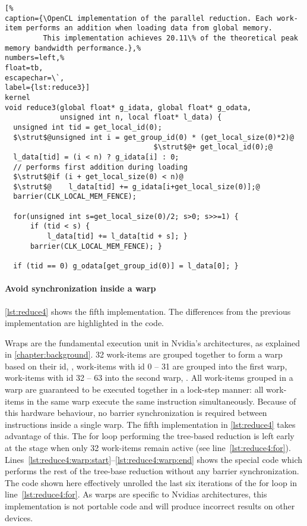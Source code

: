 \begin{lstlisting}[%                                                             
caption={\OpenCL implementation of the parallel reduction. Each work-item performs an addition when loading data from global memory.
         This implementation achieves 20.11\% of the theoretical peak memory bandwidth performance.},%
numbers=left,%
float=tb,
escapechar=\`,
label={lst:reduce3}]
kernel
void reduce3(global float* g_idata, global float* g_odata,
             unsigned int n, local float* l_data) {
  unsigned int tid = get_local_id(0);
  $\strut$@unsigned int i = get_group_id(0) * (get_local_size(0)*2)@
                                   $\strut$@+ get_local_id(0);@
  l_data[tid] = (i < n) ? g_idata[i] : 0;
  // performs first addition during loading
  $\strut$@if (i + get_local_size(0) < n)@
  $\strut$@    l_data[tid] += g_idata[i+get_local_size(0)];@
  barrier(CLK_LOCAL_MEM_FENCE);

  for(unsigned int s=get_local_size(0)/2; s>0; s>>=1) {
      if (tid < s) {
          l_data[tid] += l_data[tid + s]; }
      barrier(CLK_LOCAL_MEM_FENCE); }

  if (tid == 0) g_odata[get_group_id(0)] = l_data[0]; }
\end{lstlisting}

\newpage

\paragraph{Avoid synchronization inside a warp}

\autoref{lst:reduce4} shows the fifth implementation.
The differences from the previous implementation are highlighted in the code.

Wraps are the fundamental execution unit in Nvidia's \GPU architectures, as explained in \autoref{chapter:background}.
32 work-items are grouped together to form a warp based on their id, \ie, work-items with id 0 -- 31 are grouped into the first warp, work-items with id 32 -- 63 into the second warp, \etc.
All work-items grouped in a warp are guaranteed to be executed together in a lock-step manner:
all work-items in the same warp execute the same instruction simultaneously.
Because of this hardware behaviour, no barrier synchronization is required between instructions inside a single warp.
The fifth implementation in \autoref{lst:reduce4} takes advantage of this.
The for loop performing the tree-based reduction is left early at the stage when only 32 work-items remain active (see line~\ref{lst:reduce4:for}).
Lines~\ref{lst:reduce4:warp:start}--\ref{lst:reduce4:warp:end} shows the special code which performs the rest of the tree-base reduction without any barrier synchronization.
The code shown here effectively unrolled the last six iterations of the for loop in line~\ref{lst:reduce4:for}.
As warps are specific to Nvidias \GPU architectures, this implementation is not portable \OpenCL code and will produce incorrect results on other \OpenCL devices.

